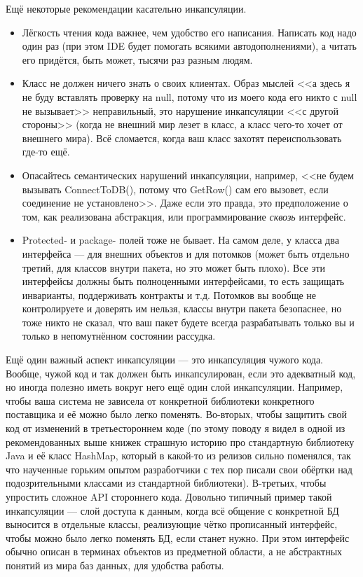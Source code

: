 \documentclass[a5paper]{article}
\begin{document}
Ещё некоторые рекомендации касательно инкапсуляции.

\begin{itemize}
    \item Лёгкость чтения кода важнее, чем удобство его написания. Написать код надо один раз (при этом IDE будет помогать всякими автодополнениями), а читать его придётся, быть может, тысячи раз разным людям.
    \item Класс не должен ничего знать о своих клиентах. Образ мыслей <<а здесь я не буду вставлять проверку на null, потому что из моего кода его никто с null не вызывает>> неправильный, это нарушение инкапсуляции <<с другой стороны>> (когда не внешний мир лезет в класс, а класс чего-то хочет от внешнего мира). Всё сломается, когда ваш класс захотят переиспользовать где-то ещё.
    \item Опасайтесь семантических нарушений инкапсуляции, например, <<не будем вызывать ConnectToDB(), потому что GetRow() сам его вызовет, если соединение не установлено>>. Даже если это правда, это предположение о том, как реализована абстракция, или программирование \textit{сквозь} интерфейс.
    \item Protected- и package- полей тоже не бывает. На самом деле, у класса два интерфейса --- для внешних объектов и для потомков (может быть отдельно третий, для классов внутри пакета, но это может быть плохо). Все эти интерфейсы должны быть полноценными интерфейсами, то есть защищать инварианты, поддерживать контракты и т.д. Потомков вы вообще не контролируете и доверять им нельзя, классы внутри пакета безопаснее, но тоже никто не сказал, что ваш пакет будете всегда разрабатывать только вы и только в непомутнённом состоянии рассудка.
\end{itemize}

Ещё один важный аспект инкапсуляции --- это инкапсуляция чужого кода. Вообще, чужой код и так должен быть инкапсулирован, если это адекватный код, но иногда полезно иметь вокруг него ещё один слой инкапсуляции. Например, чтобы ваша система не зависела от конкретной библиотеки конкретного поставщика и её можно было легко поменять. Во-вторых, чтобы защитить свой код от изменений в третьестороннем коде (по этому поводу я видел в одной из рекомендованных выше книжек страшную историю про стандартную библиотеку Java и её класс HashMap, который в какой-то из релизов сильно поменялся, так что наученные горьким опытом разработчики с тех пор писали свои обёртки над подозрительными классами из стандартной библиотеки). В-третьих, чтобы упростить сложное API стороннего кода. Довольно типичный пример такой инкапсуляции --- слой доступа к данным, когда всё общение с конкретной БД выносится в отдельные классы, реализующие чётко прописанный интерфейс, чтобы можно было легко поменять БД, если станет нужно. При этом интерфейс обычно описан в терминах объектов из предметной области, а не абстрактных понятий из мира баз данных, для удобства работы.
\end{document}

